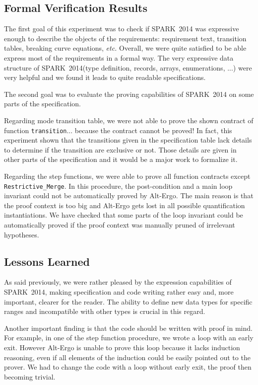 \documentclass[10pt,a4paper,twocolumn]{article}
\newcommand{\newspark}{SPARK~2014\xspace}
\newcommand{\altergo}{Alt-Ergo\xspace}
\newcommand{\etc}{\textit{etc.}\xspace}
\newcommand{\SPARK}[1]{\lstinline[language=Ada,basicstyle={\footnotesize
      \sffamily},framesep=0pt]$#1$}
\begin{document}
\subsection{Formal Verification Results}

The first goal of this experiment was to check if \newspark was
expressive enough to describe the objects of the requirements:
requirement text, transition tables, breaking curve equations, \etc
Overall, we were quite satisfied to be able express most of the
requirements in a formal way. The very expressive data structure of
\newspark (type definition, records, arrays, enumerations, ...) were
very helpful and we found it leads to quite readable specifications.

The second goal was to evaluate the proving capabilities of \newspark
on some parts of the specification.

Regarding mode transition table, we were not able to prove the shown
contract of function \SPARK{transition}... because the contract cannot
be proved! In fact, this experiment shown that the transitions given
in the specification table lack details to determine if the transition
are exclusive or not. Those details are given in other parts of the
specification and it would be a major work to formalize it.

Regarding the step functions, we were able to prove all function
contracts except \SPARK{Restrictive_Merge}. In this procedure, the
post-condition and a main loop invariant could not be automatically
proved by \altergo. The main reason is that the proof context is too
big and \altergo gets lost in all possible quantification
instantiations. We have checked that some parts of the loop invariant
could be automatically proved if the proof context was manually pruned
of irrelevant hypotheses.

\subsection{Lessons Learned}

As said previously, we were rather pleased by the expression
capabilities of \newspark, making specification and code writing
rather easy and, more important, clearer for the reader. The ability
to define new data types for specific ranges and incompatible with
other types is crucial in this regard.

Another important finding is that the code should be written with
proof in mind. For example, in one of the step function procedure, we
wrote a loop with an early exit. However \altergo is unable to prove
this loop because it lacks induction reasoning, even if all elements
of the induction could be easily pointed out to the prover. We had to
change the code with a loop without early exit, the proof then
becoming trivial.
\end{document}
